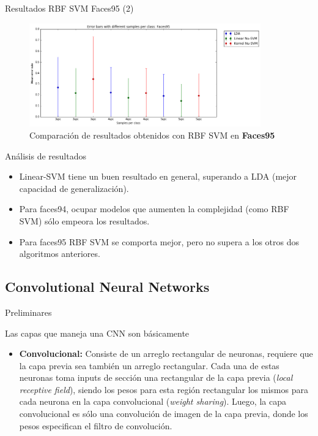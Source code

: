 \documentclass{beamer}
\begin{document}
\begin{frame}{Resultados RBF SVM Faces95 (2)}
\begin{figure}[htpb!]
\centering
\includegraphics[width=10cm]{ksvm_rescomp95}
\caption{Comparación de resultados obtenidos con RBF SVM en \textbf{Faces95}}
\end{figure}
\end{frame}

\begin{frame}{Análisis de resultados}
\begin{itemize}
    \item Linear-SVM tiene un buen resultado en general, superando a LDA (mejor capacidad de generalización).
    \item Para faces94, ocupar modelos que aumenten la complejidad (como RBF SVM) sólo empeora los resultados.
    \item Para faces95 RBF SVM se comporta mejor, pero no supera a los otros dos algoritmos anteriores.
\end{itemize}
\end{frame}

\subsection{Convolutional Neural Networks}

\begin{frame}{Preliminares}

Las capas que maneja una CNN son básicamente

\begin{itemize}
  \item \textbf{Convolucional:} Consiste de un arreglo rectangular de neuronas, requiere que la capa previa sea también un arreglo rectangular. Cada una de estas neuronas toma inputs de sección una rectangular de la capa previa (\textit{local receptive field}), siendo los pesos para esta región rectangular los mismos para cada neurona en la capa convolucional (\textit{weight sharing}). Luego, la capa convolucional es sólo una convolución de imagen de la capa previa, donde los pesos especifican el filtro de convolución.
  \end{itemize}
\end{frame}
\end{document}
